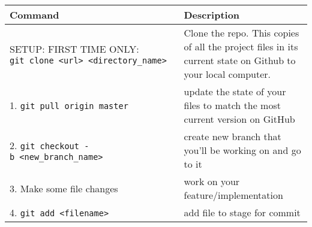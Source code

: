 \documentclass[
]{book}
\begin{document}
\begin{longtable}[]{@{}ll@{}}
\toprule
\begin{minipage}[b]{0.34\columnwidth}\raggedright
Command\strut
\end{minipage} & \begin{minipage}[b]{0.60\columnwidth}\raggedright
Description\strut
\end{minipage}\tabularnewline
\midrule
\endhead
\begin{minipage}[t]{0.34\columnwidth}\raggedright
SETUP: FIRST TIME ONLY: \texttt{git\ clone\ \textless{}url\textgreater{}\ \textless{}directory\_name\textgreater{}}\strut
\end{minipage} & \begin{minipage}[t]{0.60\columnwidth}\raggedright
Clone the repo. This copies of all the project files in its current state on Github to your local computer.\strut
\end{minipage}\tabularnewline
\begin{minipage}[t]{0.34\columnwidth}\raggedright
1. \texttt{git\ pull\ origin\ master}\strut
\end{minipage} & \begin{minipage}[t]{0.60\columnwidth}\raggedright
update the state of your files to match the most current version on GitHub\strut
\end{minipage}\tabularnewline
\begin{minipage}[t]{0.34\columnwidth}\raggedright
2. \texttt{git\ checkout\ -b\ \textless{}new\_branch\_name\textgreater{}}\strut
\end{minipage} & \begin{minipage}[t]{0.60\columnwidth}\raggedright
create new branch that you'll be working on and go to it\strut
\end{minipage}\tabularnewline
\begin{minipage}[t]{0.34\columnwidth}\raggedright
3. Make some file changes\strut
\end{minipage} & \begin{minipage}[t]{0.60\columnwidth}\raggedright
work on your feature/implementation\strut
\end{minipage}\tabularnewline
\begin{minipage}[t]{0.34\columnwidth}\raggedright
4. \texttt{git\ add\ \textless{}filename\textgreater{}}\strut
\end{minipage} & \begin{minipage}[t]{0.60\columnwidth}\raggedright
add file to stage for commit\strut
\end{minipage}\tabularnewline

\end{longtable}
\end{document}
